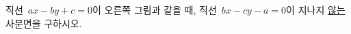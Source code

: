 \noindent\begin{minipage}[t]{0.58\linewidth}\vspace{0pt}\raggedright 직선~$ax-by+c=0$이 오른쪽 그림과 같을 때, 직선~$bx-cy-a=0$이 지나지 \underline{않는} 사분면을 구하시오. \end{minipage}\hfill\begin{minipage}[t]{0.4\linewidth}\vspace{0pt}\centering \resizebox{\ifdim\width>\linewidth\linewidth\else\width\fi}{!}{}\end{minipage}\par
